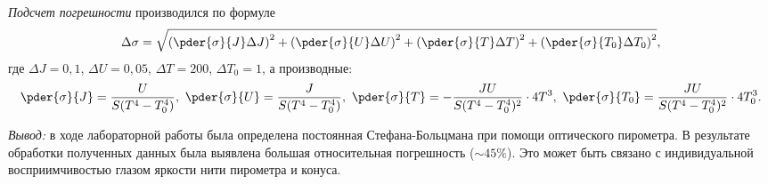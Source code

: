 \documentclass[10pt,pscyr,nonums]{hedlab}
\begin{document}
  \emph{Подсчет погрешности} производился по формуле
  \[
    \Delta\sigma = \sqrt{\left( \pder{\sigma}{J}\Delta J \right)^2 +
    \left( \pder{\sigma}{U}\Delta U \right)^2 +
    \left( \pder{\sigma}{T}\Delta T \right)^2 +
    \left( \pder{\sigma}{T_0}\Delta T_0 \right)^2},
  \]
  где \( \Delta J = 0,\!1 \), \( \Delta U = 0,\!05 \), \( \Delta T = 200 \),
  \( \Delta T_0 = 1 \), а производные:
  \[
    \pder{\sigma}{J} = \frac{U}{S(T^4 - T_0^4)}, \ 
    \pder{\sigma}{U} = \frac{J}{S(T^4 - T_0^4)}, \ 
    \pder{\sigma}{T} = -\frac{JU}{S(T^4 - T_0^4)^2}\cdot 4T^3, \ 
    \pder{\sigma}{T_0} = \frac{JU}{S(T^4 - T_0^4)^2}\cdot 4T_0^3.
  \]
  
  \emph{Вывод:} в ходе лабораторной работы была определена постоянная
    Стефана-Больцмана при помощи оптического пирометра. В результате обработки
    полученных данных была выявлена большая относительная погрешность
    (\( \sim 45\% \)). Это может быть связано с индивидуальной восприимчивостью
    глазом яркости нити пирометра и конуса.
\end{document}
